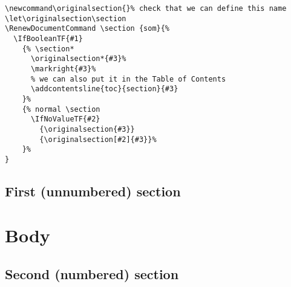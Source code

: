 \documentclass{report}
\newcommand\originalsection{}%
\let\originalsection\section
\begin{document}
\noindent
\begin{boxedminipage}{\textwidth}
{\small\begin{verbatim}
\newcommand\originalsection{}% check that we can define this name
\let\originalsection\section
\RenewDocumentCommand \section {som}{%
  \IfBooleanTF{#1}
    {% \section*
      \originalsection*{#3}%
      \markright{#3}%
      % we can also put it in the Table of Contents
      \addcontentsline{toc}{section}{#3}
    }%
    {% normal \section
      \IfNoValueTF{#2}
        {\originalsection{#3}}
        {\originalsection[#2]{#3}}%
    }%
}
\end{verbatim}}
\end{boxedminipage}

\section*{First (unnumbered) section}

\lipsum

\chapter{Body}

\section{Second (numbered) section}

\lipsum
\end{document}
